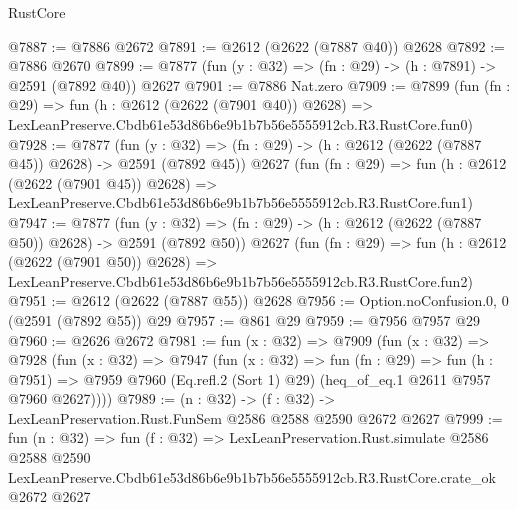 \begin{lexlean}{RustCore}
\begin{coremodule}
@7887 := @7886 @2672
@7891 := @2612 (@2622 (@7887 @40)) @2628
@7892 := @7886 @2670
@7899 := @7877 (fun (y : @32) => (fn : @29) -> (h : @7891) -> @2591 (@7892 @40)) @2627
@7901 := @7886 Nat.zero
@7909 := @7899
    (fun (fn : @29) =>
    fun (h : @2612 (@2622 (@7901 @40)) @2628) =>
    LexLeanPreserve.Cbdb61e53d86b6e9b1b7b56e5555912cb.R3.RustCore.fun0)
@7928 := @7877
    (fun (y : @32) => (fn : @29) -> (h : @2612 (@2622 (@7887 @45)) @2628) -> @2591 (@7892 @45))
    @2627
    (fun (fn : @29) =>
    fun (h : @2612 (@2622 (@7901 @45)) @2628) =>
    LexLeanPreserve.Cbdb61e53d86b6e9b1b7b56e5555912cb.R3.RustCore.fun1)
@7947 := @7877
    (fun (y : @32) => (fn : @29) -> (h : @2612 (@2622 (@7887 @50)) @2628) -> @2591 (@7892 @50))
    @2627
    (fun (fn : @29) =>
    fun (h : @2612 (@2622 (@7901 @50)) @2628) =>
    LexLeanPreserve.Cbdb61e53d86b6e9b1b7b56e5555912cb.R3.RustCore.fun2)
@7951 := @2612 (@2622 (@7887 @55)) @2628
@7956 := Option.noConfusion.{0, 0} (@2591 (@7892 @55)) @29
@7957 := @861 @29
@7959 := @7956 @7957 @29
@7960 := @2626 @2672
@7981 := fun (x : @32) =>
  @7909
    (fun (x : @32) =>
    @7928
      (fun (x : @32) =>
      @7947
        (fun (x : @32) =>
        fun (fn : @29) =>
        fun (h : @7951) =>
        @7959 @7960 (Eq.refl.{2} (Sort 1) @29) (heq_of_eq.{1} @2611 @7957 @7960 @2627))))
@7989 := (n : @32) -> (f : @32) -> LexLeanPreservation.Rust.FunSem @2586 @2588 @2590 @2672 @2627
@7999 := fun (n : @32) =>
  fun (f : @32) =>
  LexLeanPreservation.Rust.simulate
    @2586
    @2588
    @2590
    LexLeanPreserve.Cbdb61e53d86b6e9b1b7b56e5555912cb.R3.RustCore.crate_ok
    @2672
    @2627
\end{coremodule}
\end{lexlean}
